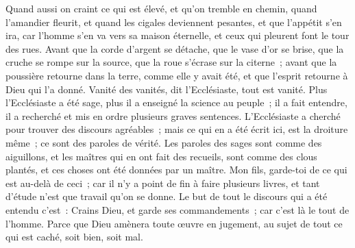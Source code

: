 \begin{multicols}{2}
Quand aussi on craint ce qui est élevé, et qu'on tremble en chemin, quand l'amandier fleurit, et quand les cigales deviennent pesantes, et que l'appétit s'en ira, car l'homme s'en va vers sa maison éternelle, et ceux qui pleurent font le tour des rues.
Avant que la corde d'argent se détache, que le vase d'or se brise, que la cruche se rompe sur la source, que la roue s'écrase sur la citerne~;
avant que la poussière retourne dans la terre, comme elle y avait été, et que l'esprit retourne à Dieu qui l'a donné.
Vanité des vanités, dit l'Ecclésiaste, tout est vanité.
Plus l'Ecclésiaste a été sage, plus il a enseigné la science au peuple~; il a fait entendre, il a recherché et mis en ordre plusieurs graves sentences. 
L'Ecclésiaste a cherché pour trouver des discours agréables~; mais ce qui en a été écrit ici, est la droiture même~; ce sont des paroles de vérité. 
Les paroles des sages sont comme des aiguillons, et les maîtres qui en ont fait des recueils, sont comme des clous plantés, et ces choses ont été données par un maître.
Mon fils, garde-toi de ce qui est au-delà de ceci~; car il n'y a point de fin à faire plusieurs livres, et tant d'étude n'est que travail qu'on se donne. 
Le but de tout le discours qui a été entendu c'est~: Crains Dieu, et garde ses commandements~; car c'est là le tout de l'homme.
Parce que Dieu amènera toute œuvre en jugement, au sujet de tout ce qui est caché, soit bien, soit mal.
\PPE{}
\end{multicols}
